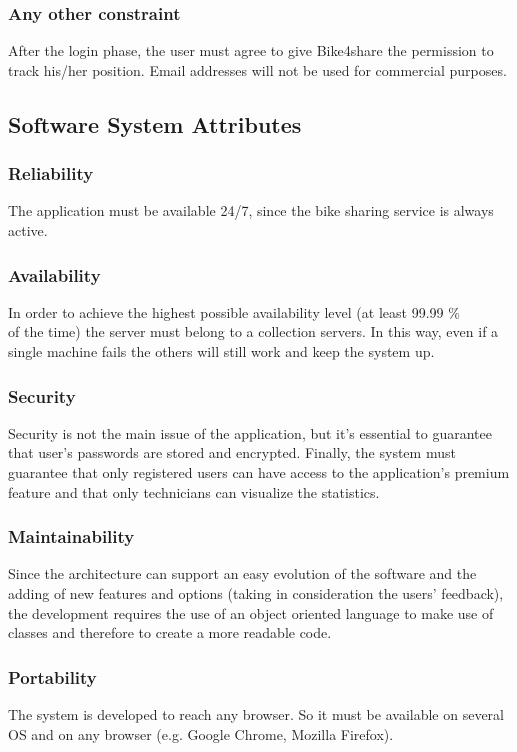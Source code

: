 \documentclass{article}
\begin{document}
\subsubsection{Any other constraint}
After the login phase, the user must agree to give Bike4share the permission to track his/her position. 
Email addresses will not be used for commercial purposes. 
\subsection{Software System Attributes}
\subsubsection{Reliability}
The application must be available 24/7, since the bike sharing service is always active.
\subsubsection{Availability} 
In order to achieve the highest possible availability level (at least 99.99 \%\\ of the time) the server must belong to a collection servers. In this way, even if a single machine fails the others will still work and keep the system up.
\subsubsection{Security}
Security is not the main issue of the application, but it’s essential to guarantee that user’s passwords are stored and encrypted. Finally, the system must guarantee that only registered users can have access to the application’s premium feature and that only technicians can visualize the statistics.

\subsubsection{Maintainability}
Since the architecture can support an easy evolution of the software and the adding of new features and options (taking in consideration the users’ feedback), the development requires the use of an object oriented language to make use of classes and therefore to create a more readable code.
\subsubsection{Portability}
The system is developed to reach any browser. So it must be available on several OS and on any browser (e.g. Google Chrome, Mozilla Firefox).

\end{document}
